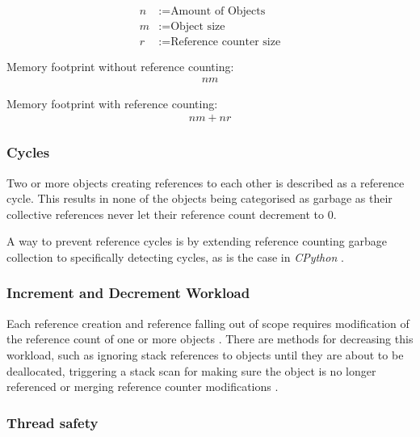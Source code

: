 \begin{align*}
n &:= \textrm{Amount of Objects}\\
m &:= \textrm{Object size} \\
r &:= \textrm{Reference counter size}
\end{align*}

Memory footprint without reference counting:
\begin{align*}
nm 
\end{align*}

Memory footprint with reference counting:
\begin{align*}
nm + nr
\end{align*}

\subsubsection{Cycles}
\label{sec:reference_counting_cycles}

Two or more objects creating references to each other is described as a
reference cycle. This results in none of the objects being categorised as
garbage as their collective references never let their reference count
decrement to 0. 

A way to prevent reference cycles is by extending reference counting garbage
collection to specifically detecting cycles, as is the case in \textit{CPython}
\cite[1.10 Reference Counts]{python-extending-gc_2008}. 

\subsubsection{Increment and Decrement Workload}

Each reference creation and reference falling out of scope requires
modification of the reference count of one or more objects \cite[6.1 Immediate
Reference Counting]{gc-generational-scavenging_1984}. There are methods for
decreasing this workload, such as ignoring stack references to objects until
they are about to be deallocated, triggering a stack scan for making sure the
object is no longer referenced \cite[6.2 Deferred Reference
Couting]{gc-generational-scavenging_1984} or merging reference counter
modifications \cite[Abstract]{gc-on-the-fly_2006}.

\subsubsection{Thread safety}

